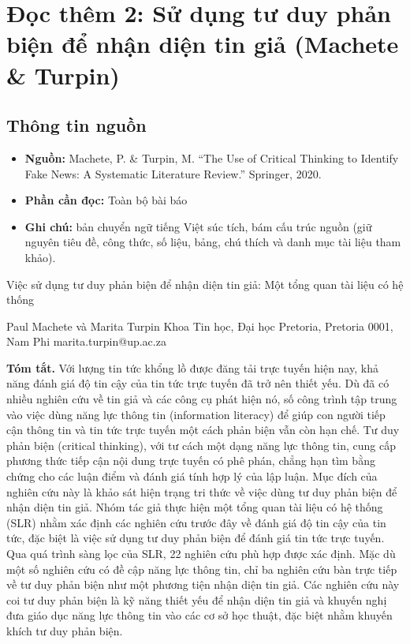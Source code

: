 \chapter{Đọc thêm 2: Sử dụng tư duy phản biện để nhận diện tin giả (Machete \& Turpin)}
\label{ch:M5L4DocThem2}

\section{Thông tin nguồn}

\begin{itemize}
  \item \textbf{Nguồn:} Machete, P. \& Turpin, M. ``The Use of Critical Thinking to Identify Fake News: A Systematic Literature Review.'' Springer, 2020.
  \item \textbf{Phần cần đọc:} Toàn bộ bài báo
  \item \textbf{Ghi chú:} bản chuyển ngữ tiếng Việt súc tích, bám cấu trúc nguồn (giữ nguyên tiêu đề, công thức, số liệu, bảng, chú thích và danh mục tài liệu tham khảo).
\end{itemize}

Việc sử dụng tư duy phản biện để nhận diện tin giả: Một tổng quan tài liệu có hệ thống

Paul Machete và Marita Turpin Khoa Tin học, Đại học Pretoria, Pretoria 0001, Nam Phi marita.turpin@up.ac.za

\textbf{Tóm tắt.} Với lượng tin tức khổng lồ được đăng tải trực tuyến hiện nay, khả năng đánh giá độ tin cậy của tin tức trực tuyến đã trở nên thiết yếu. Dù đã có nhiều nghiên cứu về tin giả và các công cụ phát hiện nó, số công trình tập trung vào việc dùng năng lực thông tin (information literacy) để giúp con người tiếp cận thông tin và tin tức trực tuyến một cách phản biện vẫn còn hạn chế. Tư duy phản biện (critical thinking), với tư cách một dạng năng lực thông tin, cung cấp phương thức tiếp cận nội dung trực tuyến có phê phán, chẳng hạn tìm bằng chứng cho các luận điểm và đánh giá tính hợp lý của lập luận. Mục đích của nghiên cứu này là khảo sát hiện trạng tri thức về việc dùng tư duy phản biện để nhận diện tin giả. Nhóm tác giả thực hiện một tổng quan tài liệu có hệ thống (SLR) nhằm xác định các nghiên cứu trước đây về đánh giá độ tin cậy của tin tức, đặc biệt là việc sử dụng tư duy phản biện để đánh giá tin tức trực tuyến. Qua quá trình sàng lọc của SLR, 22 nghiên cứu phù hợp được xác định. Mặc dù một số nghiên cứu có đề cập năng lực thông tin, chỉ ba nghiên cứu bàn trực tiếp về tư duy phản biện như một phương tiện nhận diện tin giả. Các nghiên cứu này coi tư duy phản biện là kỹ năng thiết yếu để nhận diện tin giả và khuyến nghị đưa giáo dục năng lực thông tin vào các cơ sở học thuật, đặc biệt nhằm khuyến khích tư duy phản biện.

